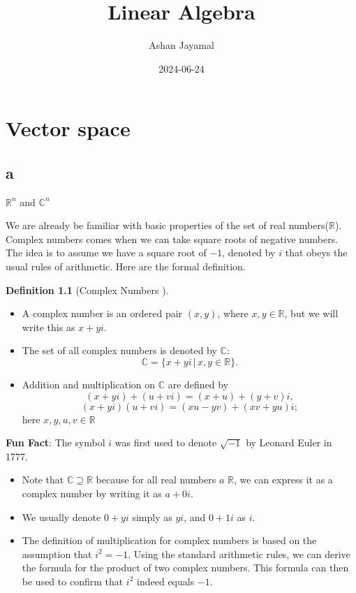 \documentclass[
]{book}
\title{Linear Algebra}
\author{Ashan Jayamal}
\date{2024-06-24}
\providecommand{\tightlist}{%
  \setlength{\itemsep}{0pt}\setlength{\parskip}{0pt}}
\theoremstyle{definition}
\newtheorem{definition}{Definition}[chapter]
\theoremstyle{definition}
\theoremstyle{definition}
\theoremstyle{definition}
\theoremstyle{remark}
\begin{document}
\maketitle

{
\setcounter{tocdepth}{1}
\tableofcontents
}
\chapter{Vector space}\label{vector-space}

\section{a}\label{a}

\(\mathbb{R}^n\) and \(\mathbb{C}^n\)

We are already be familiar with basic properties of the set of real numbers(\(\mathbb{R}\)). Complex numbers comes when we can take square roots of negative numbers. The idea is to assume we have a square root of \(−1\), denoted by \(i\) that obeys the usual rules of arithmetic. Here are the formal definition.

\begin{definition}[Complex Numbers ]
\protect\hypertarget{def:unnamed-chunk-1}{}\label{def:unnamed-chunk-1}\leavevmode

\begin{itemize}
\tightlist
\item
  A complex number is an ordered pair \((x, y)\), where \(x, y \in \mathbb{R}\), but we will write this as \(x + yi\).
\item
  The set of all complex numbers is denoted by \(\mathbb{C}\):
  \[\mathbb{C} = \{x + yi \,|\, x, y \in \mathbb{R}\}.\]
\item
  Addition and multiplication on \(\mathbb{C}\) are defined by
  \[(x + yi) + (u + vi) = (x + u) + (y + v)i,\]
  \[(x + yi)(u + vi) = (xu - yv) + (xv + yu)i;\]
  here \(x, y, u, v \in \mathbb{R}\)
\end{itemize}

\end{definition}

\textbf{Fun Fact}: The symbol \(i\) was first used to denote \(\sqrt{-1}\) by Leonard Euler in 1777.

\begin{itemize}
\tightlist
\item
  Note that \(\mathbb{C} \supseteq \mathbb{R}\) because for all real numbers \(a\) \(\mathbb{R}\), we can express it as a complex number by writing it as \(a + 0i\).
\item
  We usually denote \(0 + yi\) simply as \(yi\), and \(0 + 1i\) as \(i\).
\item
  The definition of multiplication for complex numbers is based on the assumption that \(i^2 = -1\). Using the standard arithmetic rules, we can derive the formula for the product of two complex numbers. This formula can then be used to confirm that \(i^2\) indeed equals \(-1\).
\end{itemize}
\end{document}
